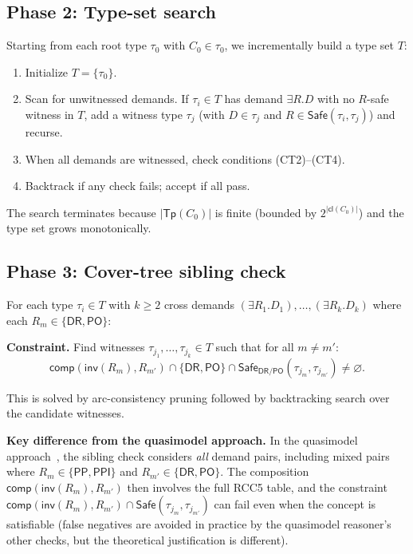 \documentclass[a4paper,11pt]{article}
\theoremstyle{definition}
\newcommand{\DR}{\ensuremath{\mathsf{DR}}}
\newcommand{\PO}{\ensuremath{\mathsf{PO}}}
\newcommand{\PP}{\ensuremath{\mathsf{PP}}}
\newcommand{\PPI}{\ensuremath{\mathsf{PPI}}}
\newcommand{\inv}{\ensuremath{\mathsf{inv}}}
\newcommand{\comp}{\ensuremath{\mathsf{comp}}}
\newcommand{\cl}{\ensuremath{\mathsf{cl}}}
\newcommand{\Tp}{\ensuremath{\mathsf{Tp}}}
\newcommand{\Safe}{\ensuremath{\mathsf{Safe}}}
\begin{document}
\subsection{Phase 2: Type-set search}

Starting from each root type $\tau_0$ with $C_0 \in \tau_0$,
we incrementally build a type set $T$:
\begin{enumerate}[nosep]
  \item Initialize $T = \{\tau_0\}$.
  \item Scan for unwitnessed demands. If $\tau_i \in T$ has demand
    $\exists R.D$ with no $R$-safe witness in $T$, add a witness
    type $\tau_j$ (with $D \in \tau_j$ and $R \in \Safe(\tau_i,\tau_j)$)
    and recurse.
  \item When all demands are witnessed, check conditions
    (CT2)--(CT4).
  \item Backtrack if any check fails; accept if all pass.
\end{enumerate}

The search terminates because $|\Tp(C_0)|$ is finite (bounded
by $2^{|\cl(C_0)|}$) and the type set grows monotonically.

\subsection{Phase 3: Cover-tree sibling check}
\label{sec:sibling}

For each type $\tau_i \in T$ with $k \geq 2$ cross demands
$(\exists R_1.D_1), \ldots, (\exists R_k.D_k)$ where each
$R_m \in \{\DR, \PO\}$:

\medskip
\noindent\textbf{Constraint.}
Find witnesses $\tau_{j_1}, \ldots, \tau_{j_k} \in T$ such that
for all $m \neq m'$:
\begin{equation}
  \comp(\inv(R_m), R_{m'}) \cap \{\DR, \PO\} \cap
    \Safe_{\DR/\PO}(\tau_{j_m}, \tau_{j_{m'}}) \neq \varnothing.
  \label{eq:sibling-compat}
\end{equation}

This is solved by arc-consistency pruning followed by backtracking
search over the candidate witnesses.

\medskip
\noindent\textbf{Key difference from the quasimodel approach.}
In the quasimodel approach~\cite{ClaudeDecidability}, the sibling
check considers \emph{all} demand pairs, including mixed pairs
where $R_m \in \{\PP,\PPI\}$ and $R_{m'} \in \{\DR,\PO\}$.
The composition $\comp(\inv(R_m), R_{m'})$ then involves the
full RCC5 table, and the constraint
$\comp(\inv(R_m), R_{m'}) \cap \Safe(\tau_{j_m}, \tau_{j_{m'}})$
can fail even when the concept is satisfiable (false negatives
are avoided in practice by the quasimodel reasoner's other
checks, but the theoretical justification is different).
\end{document}
